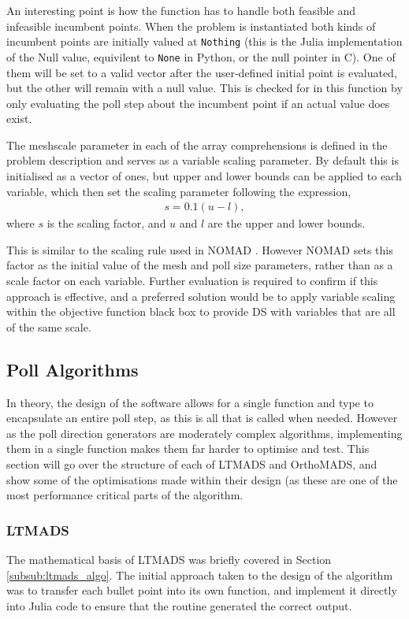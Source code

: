 An interesting point is how the function has to handle both feasible and infeasible incumbent points. When the problem is instantiated both kinds of incumbent points are initially valued at \texttt{Nothing} (this is the Julia implementation of the Null value, equivilent to \texttt{None} in Python, or the null pointer in C). One of them will be set to a valid vector after the user-defined initial point is evaluated, but the other will remain with a null value. This is checked for in this function by only evaluating the poll step about the incumbent point if an actual value does exist.

The meshscale parameter in each of the array comprehensions is defined in the problem description and serves as a variable scaling parameter. By default this is initialised as a vector of ones, but upper and lower bounds can be applied to each variable, which then set the scaling parameter following the expression,
\begin{gather}
    s = 0.1(u - l),
\end{gather}
where $s$ is the scaling factor, and $u$ and $l$ are the upper and lower bounds. 

This is similar to the scaling rule used in NOMAD \cite{LeDigabel2011AlgorithmAlgorithm}. However NOMAD sets this factor as the initial value of the mesh and poll size parameters, rather than as a scale factor on each variable. Further evaluation is required to confirm if this approach is effective, and a preferred solution would be to apply variable scaling within the objective function black box to provide DS with variables that are all of the same scale.

\subsection{Poll Algorithms}
In theory, the design of the software allows for a single function and type to encapsulate an entire poll step, as this is all that is called when needed. However as the poll direction generators are moderately complex algorithms, implementing them in a single function makes them far harder to optimise and test. This section will go over the structure of each of LTMADS and OrthoMADS, and show some of the optimisations made within their design (as these are one of the most performance critical parts of the algorithm.

\subsubsection{LTMADS}
The mathematical basis of LTMADS was briefly covered in Section \ref{subsub:ltmads_algo}. The initial approach taken to the design of the algorithm was to transfer each bullet point into its own function, and implement it directly into Julia code to ensure that the routine generated the correct output. 

